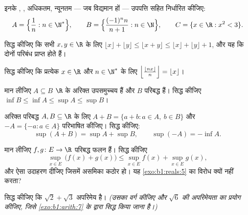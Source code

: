 \begin{exercise}[$\star$]\label{exo:b1:reals:1}
इनके , , अधिकतम, न्यूनतम --- जब विद्यमान हों --- उपपत्ति सहित
निर्धारित कीजिए:
\[
A = \Bigl\{\frac{1}{n} : n \in \N^*\Bigr\},
\qquad
B = \Bigl\{\frac{(-1)^n n}{n+1} : n \in \N\Bigr\},
\qquad
C = \{x \in \R : x^2 < 3\}.
\]
\end{exercise}

\begin{exercise}[$\star$]\label{exo:b1:reals:2}
सिद्ध कीजिए कि सभी $x, y \in \R$ के लिए $\lfloor x \rfloor + \lfloor y
\rfloor \leq \lfloor x + y \rfloor \leq \lfloor x \rfloor + \lfloor y
\rfloor + 1$, और यह कि दोनों परिबंध प्राप्त होते हैं।
\end{exercise}

\begin{exercise}[$\star$]\label{exo:b1:reals:3}
सिद्ध कीजिए कि प्रत्येक $x \in \R$ और $n \in \N^*$ के लिए $\Bigl\lfloor
\frac{\lfloor nx \rfloor}{n} \Bigr\rfloor = \lfloor x \rfloor$।
\end{exercise}

\begin{exercise}[$\star$]\label{exo:b1:reals:4}
मान लीजिए $A \subseteq B$ $\R$ के अरिक्त उपसमुच्चय हैं और $B$ परिबद्ध हैं।
सिद्ध कीजिए $\inf B \leq \inf A \leq \sup A \leq \sup B$।
\end{exercise}

\begin{exercise}[$\star\star$]\label{exo:b1:reals:5}
अरिक्त परिबद्ध $A, B \subseteq \R$ के लिए $A + B = \{a + b : a \in A,\ b \in
B\}$ और $-A = \{-a : a \in A\}$ परिभाषित कीजिए। सिद्ध कीजिए:
\[
\sup(A + B) = \sup A + \sup B,
\qquad
\sup(-A) = -\inf A .
\]
\end{exercise}

\begin{exercise}[$\star\star$]\label{exo:b1:reals:6}
मान लीजिए $f, g \colon E \to \R$ परिबद्ध फलन हैं। सिद्ध कीजिए
\[
\sup_{x \in E}\, \bigl(f(x) + g(x)\bigr) \leq \sup_{x \in E} f(x) +
\sup_{x \in E} g(x),
\]
और ऐसा उदाहरण दीजिए जिसमें असमिका कठोर हो। यह \cref{exo:b1:reals:5} का विरोध
क्यों नहीं करता?
\end{exercise}

\begin{exercise}[$\star\star$]\label{exo:b1:reals:7}
सिद्ध कीजिए कि $\sqrt 2 + \sqrt 3$ अपरिमेय है। \emph{(उसका वर्ग कीजिए और
$\sqrt 6$ की अपरिमेयता का प्रयोग कीजिए, जिसे \cref{exo:b1:arith:7} के द्वारा
सिद्ध किया जाना है।)}
\end{exercise}

